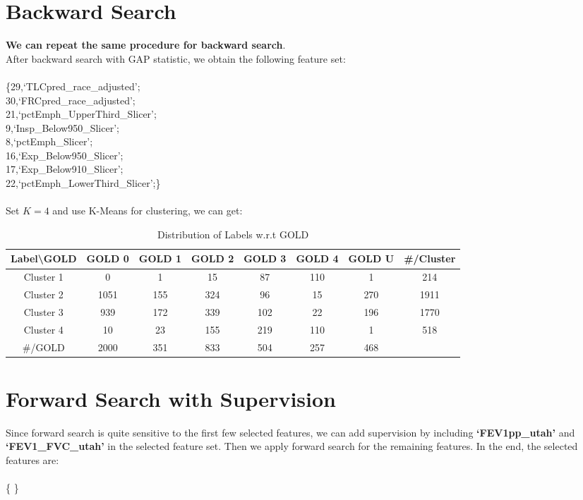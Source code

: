 \documentclass[11pt]{article}
\begin{document}
\section{Backward Search}
\textbf{We can repeat the same procedure for backward search}.\\
After backward search with GAP statistic, we obtain the following feature set:\\
\\
\{29,`TLCpred\_race\_adjusted';\\
30,`FRCpred\_race\_adjusted';\\
21,`pctEmph\_UpperThird\_Slicer';\\
9,`Insp\_Below950\_Slicer';\\
8,`pctEmph\_Slicer';\\
16,`Exp\_Below950\_Slicer';\\
17,`Exp\_Below910\_Slicer';\\
22,`pctEmph\_LowerThird\_Slicer';\}\\
\\
Set $K=4$ and use K-Means for clustering, we can get:\\
\begin{table}[ht]
\caption{Distribution of Labels w.r.t GOLD}
\centering
\begin{tabular}{c c c c c c c|c}
\hline\hline
Label\textbackslash GOLD & GOLD 0 & GOLD 1 & GOLD 2 & GOLD 3 & GOLD 4 & GOLD U & \#/Cluster\\[1ex]
\hline
Cluster 1 & 0 & 1 & 15 & 87 & 110 & 1 & 214\\
Cluster 2 & 1051 & 155 & 324 & 96 & 15 & 270 & 1911\\
Cluster 3 & 939 & 172 & 339 & 102 & 22 & 196 & 1770\\
Cluster 4 & 10 & 23 & 155 & 219 & 110 & 1 & 518\\
\hline
\#/GOLD & 2000 & 351 & 833 & 504 & 257 & 468\\[1ex]
\hline
\end{tabular}
\label{table:dist_cluster_labels_gold_1}
\end{table}

\section{Forward Search with Supervision}
Since forward search is quite sensitive to the first few selected features, we can add supervision by including \textbf{`FEV1pp\_utah'} and \textbf{`FEV1\_FVC\_utah'} in the selected feature set. Then we apply forward search for the remaining features. In the end, the selected features are:\\
\\
\{
\}
\end{document}
